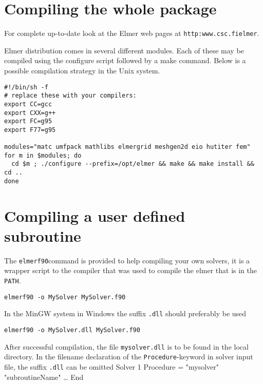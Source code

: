 
\section{Compiling the whole package}

For complete up-to-date  look at the Elmer web pages at
\texttt{http:\/\/www.csc.fi\/elmer}. 

Elmer distribution comes in several different modules. Each of these may be compiled using
the configure script followed by a make command. 
Below is a possible compilation strategy in the Unix system. 
\begin{verbatim}
#!/bin/sh -f
# replace these with your compilers:
export CC=gcc
export CXX=g++
export FC=g95
export F77=g95

modules="matc umfpack mathlibs elmergrid meshgen2d eio hutiter fem" 
for m in $modules; do
  cd $m ; ./configure --prefix=/opt/elmer && make && make install && cd .. 
done
\end{verbatim}

\section{Compiling a user defined subroutine}

The \texttt{elmerf90}command is provided to help compiling your own solvers, it is a wrapper script to the 
compiler that was used to compile the elmer that is in the \texttt{PATH}.
\begin{verbatim}
elmerf90 -o MySolver MySolver.f90
\end{verbatim}
In the MinGW system in Windows the suffix \texttt{.dll} should preferably be used
\begin{verbatim}
elmerf90 -o MySolver.dll MySolver.f90
\end{verbatim}

After successful compilation, the file \texttt{mysolver.dll} is to be found in the local directory. 
In the filename declaration of the \texttt{Procedure}-keyword in solver input file, the suffix \texttt{.dll} can be omitted
\ttbegin
Solver 1
  Procedure = "mysolver" "subroutineName"
  \ldots
End
\ttend
